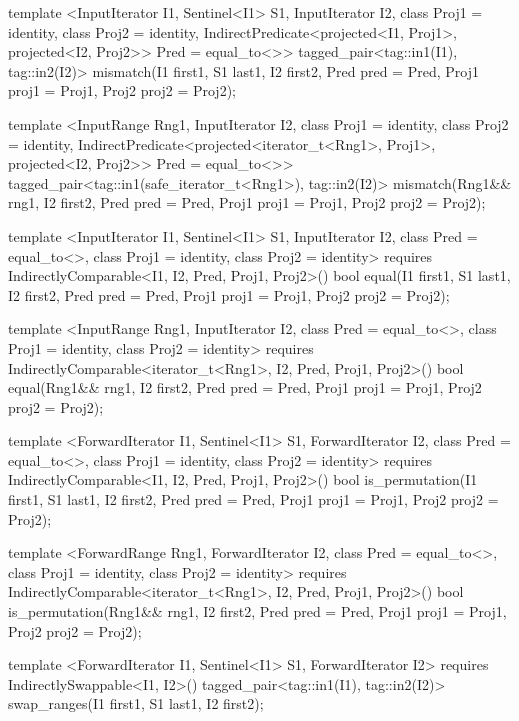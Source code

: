 \begin{codeblock}
template <InputIterator I1, Sentinel<I1> S1, InputIterator I2,
    class Proj1 = identity, class Proj2 = identity,
    IndirectPredicate<projected<I1, Proj1>, projected<I2, Proj2>> Pred = equal_to<>>
  tagged_pair<tag::in1(I1), tag::in2(I2)>
    mismatch(I1 first1, S1 last1, I2 first2, Pred pred = Pred{},
             Proj1 proj1 = Proj1{}, Proj2 proj2 = Proj2{});

template <InputRange Rng1, InputIterator I2,
    class Proj1 = identity, class Proj2 = identity,
    IndirectPredicate<projected<iterator_t<Rng1>, Proj1>,
      projected<I2, Proj2>> Pred = equal_to<>>
  tagged_pair<tag::in1(safe_iterator_t<Rng1>), tag::in2(I2)>
    mismatch(Rng1&& rng1, I2 first2, Pred pred = Pred{},
             Proj1 proj1 = Proj1{}, Proj2 proj2 = Proj2{});

template <InputIterator I1, Sentinel<I1> S1, InputIterator I2,
    class Pred = equal_to<>, class Proj1 = identity, class Proj2 = identity>
  requires IndirectlyComparable<I1, I2, Pred, Proj1, Proj2>()
  bool equal(I1 first1, S1 last1,
             I2 first2, Pred pred = Pred{},
             Proj1 proj1 = Proj1{}, Proj2 proj2 = Proj2{});

template <InputRange Rng1, InputIterator I2, class Pred = equal_to<>,
    class Proj1 = identity, class Proj2 = identity>
  requires IndirectlyComparable<iterator_t<Rng1>, I2, Pred, Proj1, Proj2>()
  bool equal(Rng1&& rng1, I2 first2, Pred pred = Pred{},
             Proj1 proj1 = Proj1{}, Proj2 proj2 = Proj2{});

template <ForwardIterator I1, Sentinel<I1> S1, ForwardIterator I2,
    class Pred = equal_to<>, class Proj1 = identity, class Proj2 = identity>
  requires IndirectlyComparable<I1, I2, Pred, Proj1, Proj2>()
  bool is_permutation(I1 first1, S1 last1, I2 first2,
                      Pred pred = Pred{},
                      Proj1 proj1 = Proj1{}, Proj2 proj2 = Proj2{});

template <ForwardRange Rng1, ForwardIterator I2, class Pred = equal_to<>,
    class Proj1 = identity, class Proj2 = identity>
  requires IndirectlyComparable<iterator_t<Rng1>, I2, Pred, Proj1, Proj2>()
  bool is_permutation(Rng1&& rng1, I2 first2, Pred pred = Pred{},
                      Proj1 proj1 = Proj1{}, Proj2 proj2 = Proj2{});

template <ForwardIterator I1, Sentinel<I1> S1, ForwardIterator I2>
  requires IndirectlySwappable<I1, I2>()
  tagged_pair<tag::in1(I1), tag::in2(I2)>
    swap_ranges(I1 first1, S1 last1, I2 first2);


\end{codeblock}
